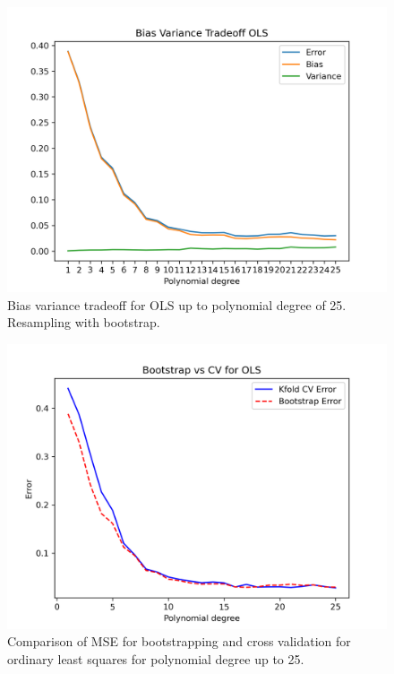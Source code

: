 \documentclass{article}
\begin{document}
\begin{figure}[htbp]
    \centering
    \includegraphics[width=\textwidth*2/3]{Project1/figures/Terrain/Bias_Variance_Tradeoff_OLS_25.png}
    \caption{Bias variance tradeoff for OLS up to polynomial degree of 25. Resampling with bootstrap.}
    \label{fig:TerrainBVtradeoff}
\end{figure}


\begin{figure}[htbp]
    \centering
    \includegraphics[width=\textwidth*2/3]{Project1/figures/Terrain/Bias_vs_Var_OLS_25.png}
    \caption{Comparison of MSE for bootstrapping and cross validation for ordinary least squares for polynomial degree up to 25.}
    \label{fig:TerrainBvsCV}
\end{figure}
\end{document}
